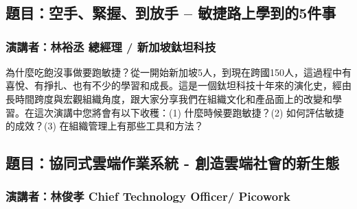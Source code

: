 \documentclass[12pt,oneside,a4paper]{book}
\begin{document}
\section{\TitleTwoB}
\subsection*{\ChairTwoB}
\ListTwoB
\PaperTwoB

\section{\TitleTwoC}
\subsection*{\ChairTwoC}
\ListTwoC
\PaperTwoC

\section{\TitleTwoD}
\subsection*{\ChairTwoD}
\ListTwoD

\subsection*{題目：空手、緊握、到放手 – 敏捷路上學到的5件事}

\subsubsection*{演講者：林裕丞 總經理 / 新加坡鈦坦科技}

為什麼吃飽沒事做要跑敏捷？從一開始新加坡5人，到現在跨國150人，這過程中有喜悅、有掙扎、也有不少的學習和成長。這是一個鈦坦科技十年來的演化史，經由長時間跨度與宏觀組織角度，跟大家分享我們在組織文化和產品面上的改變和學習。在這次演講中您將會有以下收穫：(1) 什麼時候要跑敏捷？(2) 如何評估敏捷的成效？(3) 在組織管理上有那些工具和方法？ 


\subsection*{題目：協同式雲端作業系統 - 創造雲端社會的新生態}

\subsubsection*{演講者：林俊孝 Chief Technology Officer/ Picowork}
\end{document}
